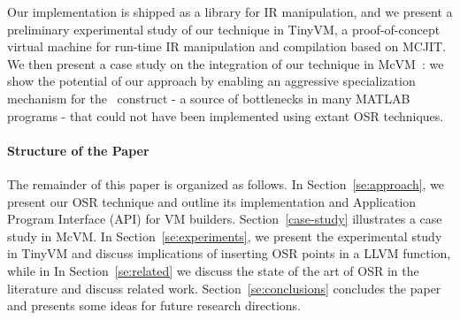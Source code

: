 Our implementation is shipped as a library for IR manipulation, and we present a preliminary experimental study of our technique in TinyVM, a proof-of-concept virtual machine for run-time IR manipulation and compilation based on MCJIT. We then present a case study on the integration of our technique in McVM~\cite{chevalier2010mcvm}: we show the potential of our approach by enabling an aggressive specialization mechanism for the \feval\ construct - a source of bottlenecks in many MATLAB programs - that could not have been implemented using extant OSR techniques.

\paragraph{Structure of the Paper}
The remainder of this paper is organized as follows. In Section~\ref{se:approach}, we present our OSR technique and outline its implementation and Application Program Interface (API) for VM builders. Section~\ref{case-study} illustrates a case study in McVM. In Section~\ref{se:experiments}, we present the experimental study in TinyVM and discuss implications of inserting OSR points in a LLVM function, while in In Section~\ref{se:related} we discuss the state of the art of OSR in the literature and discuss related work. Section~\ref{se:conclusions} concludes the paper and presents some ideas for future research directions. 
  
  
  
  
  
  
  
  